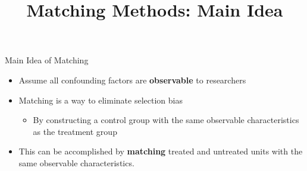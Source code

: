 \documentclass[hyperref={pdfpagelabels=false}]{beamer}
\begin{document}
\title[]  
{Matching Methods: Main Idea}


\author 
{}

\institute{}






\date
{}


\begin{frame}{}
\titlepage
\end{frame}




\begin{frame}{Main Idea of Matching}
	\begin{itemize} 
		
		\item Assume all confounding factors are \textbf{observable} to researchers
				\vspace{0.2cm}

		\item Matching is a way to eliminate selection bias 
		
							\begin{itemize} 
												\vspace{0.2cm}
		\item By constructing a control group with the same observable characteristics as the treatment group
			\end{itemize}
				\vspace{0.2cm}
			\item This can be accomplished by \textbf{matching} treated and untreated units with the same observable characteristics.
		
		
	\end{itemize}
\end{frame}
\end{document}
